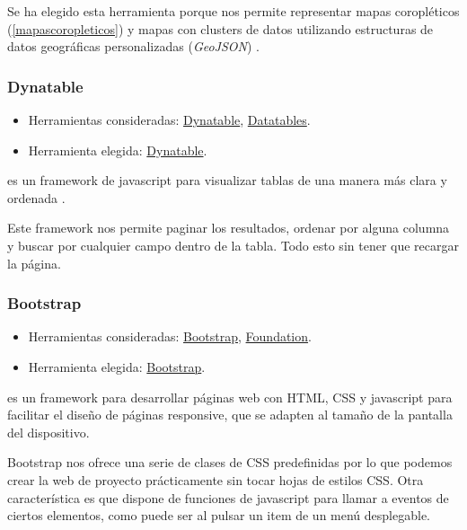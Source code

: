 Se ha elegido esta herramienta porque nos permite representar mapas coropléticos (\ref{mapascoropleticos}) y mapas con clusters de datos \cite{misc:foliumcluster} utilizando estructuras de datos geográficas personalizadas (\textit{GeoJSON}) \cite{docs:geojson}.

\subsubsection{Dynatable}

\begin{itemize}
	\tightlist
	\item
	Herramientas consideradas:
	\href{https://www.dynatable.com/}{Dynatable}, 
	\href{https://datatables.net/}{Datatables}.
	\item
	Herramienta elegida:
	\href{https://www.dynatable.com/}{Dynatable}.
\end{itemize}

 es un framework de javascript para visualizar tablas de una manera más clara y ordenada \cite{docs:dynatable}.

Este framework nos permite paginar los resultados, ordenar por alguna columna y buscar por cualquier campo dentro de la tabla. Todo esto sin tener que recargar la página.

\subsubsection{Bootstrap}

\begin{itemize}
	\tightlist
	\item
	Herramientas consideradas:
	\href{https://getbootstrap.com/}{Bootstrap}, 
	\href{https://foundation.zurb.com/}{Foundation}.
	\item
	Herramienta elegida:
	\href{https://getbootstrap.com/}{Bootstrap}.
\end{itemize}

 es un framework para desarrollar páginas web con HTML, CSS y javascript para facilitar el diseño de páginas responsive, que se adapten al tamaño de la pantalla del dispositivo.

Bootstrap nos ofrece una serie de clases de CSS predefinidas por lo que podemos crear la web de proyecto prácticamente sin tocar hojas de estilos CSS. Otra característica es que dispone de funciones de javascript para llamar a eventos de ciertos elementos, como puede ser al pulsar un item de un menú desplegable.

